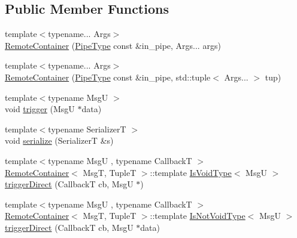 \subsection*{Public Member Functions}
\begin{DoxyCompactItemize}
\item 
{\footnotesize template$<$typename... Args$>$ }\\\hyperlink{structvt_1_1pipe_1_1interface_1_1_remote_container_a5bb09812f8bb6778051d9cc6b4662dc5}{Remote\+Container} (\hyperlink{namespacevt_ac9852acda74d1896f48f406cd72c7bd3}{Pipe\+Type} const \&in\+\_\+pipe, Args... args)
\item 
{\footnotesize template$<$typename... Args$>$ }\\\hyperlink{structvt_1_1pipe_1_1interface_1_1_remote_container_afcd73686512c7d7d25beeb8a9f9d1c73}{Remote\+Container} (\hyperlink{namespacevt_ac9852acda74d1896f48f406cd72c7bd3}{Pipe\+Type} const \&in\+\_\+pipe, std\+::tuple$<$ Args... $>$ tup)
\item 
{\footnotesize template$<$typename MsgU $>$ }\\void \hyperlink{structvt_1_1pipe_1_1interface_1_1_remote_container_a1c52032c6536ca384aa0769846b01424}{trigger} (MsgU $\ast$data)
\item 
{\footnotesize template$<$typename SerializerT $>$ }\\void \hyperlink{structvt_1_1pipe_1_1interface_1_1_remote_container_ad272af02305b8a050f8e393dd551538b}{serialize} (SerializerT \&s)
\item 
{\footnotesize template$<$typename MsgU , typename CallbackT $>$ }\\\hyperlink{structvt_1_1pipe_1_1interface_1_1_remote_container}{Remote\+Container}$<$ MsgT, TupleT $>$\+::template \hyperlink{structvt_1_1pipe_1_1interface_1_1_remote_container_a0cf5387a6b1db885a7a224bab60ce16d}{Is\+Void\+Type}$<$ MsgU $>$ \hyperlink{structvt_1_1pipe_1_1interface_1_1_remote_container_ac109c549822ea32fe268e09d37e21822}{trigger\+Direct} (CallbackT cb, MsgU $\ast$)
\item 
{\footnotesize template$<$typename MsgU , typename CallbackT $>$ }\\\hyperlink{structvt_1_1pipe_1_1interface_1_1_remote_container}{Remote\+Container}$<$ MsgT, TupleT $>$\+::template \hyperlink{structvt_1_1pipe_1_1interface_1_1_remote_container_a1dc69f6cfa1318c856a412940e3dbb50}{Is\+Not\+Void\+Type}$<$ MsgU $>$ \hyperlink{structvt_1_1pipe_1_1interface_1_1_remote_container_a50eb531253f7ef5a31fcf43861c4b39a}{trigger\+Direct} (CallbackT cb, MsgU $\ast$data)
\end{DoxyCompactItemize}


